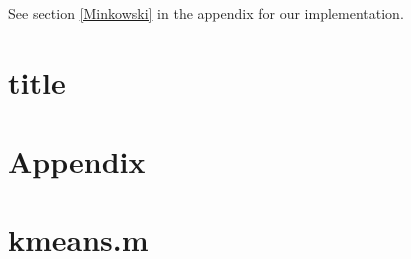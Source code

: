 \documentclass[10pt]{article}
\begin{document}
\subsection{}
See section \ref{Minkowski} in the appendix for our implementation.

\subsection{}

\section{title}

\newpage
\section*{Appendix}
\appendix
\section{kmeans.m}
{\label{Minkowski}}
\end{document}
